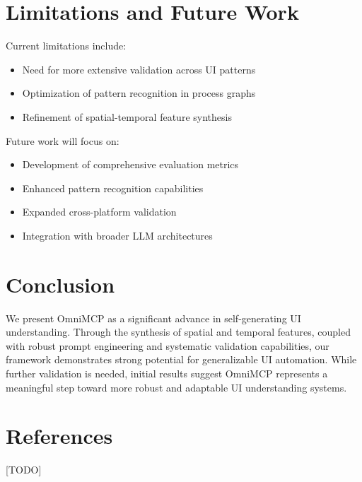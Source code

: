 \documentclass{article}
\begin{document}
\section{Limitations and Future Work}
Current limitations include:
\begin{itemize}
    \item Need for more extensive validation across UI patterns
    \item Optimization of pattern recognition in process graphs
    \item Refinement of spatial-temporal feature synthesis
\end{itemize}

Future work will focus on:
\begin{itemize}
    \item Development of comprehensive evaluation metrics
    \item Enhanced pattern recognition capabilities
    \item Expanded cross-platform validation
    \item Integration with broader LLM architectures
\end{itemize}

\section{Conclusion}
We present OmniMCP as a significant advance in self-generating UI understanding. Through the synthesis of spatial and temporal features, coupled with robust prompt engineering and systematic validation capabilities, our framework demonstrates strong potential for generalizable UI automation. While further validation is needed, initial results suggest OmniMCP represents a meaningful step toward more robust and adaptable UI understanding systems.

\section{References}
[TODO]
\end{document}

